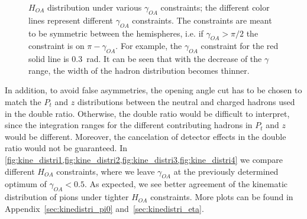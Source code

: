 \begin{figure}[h]
  \centering     %
  \caption[$H_{OA}$ distribution under various $\gamma_{OA}$ constraints]{$H_{OA}$ distribution under various $\gamma_{OA}$ constraints; the different color lines represent different $\gamma_{OA}$ constraints. The constraints are meant to be symmetric between the hemispheres, i.e. if  $\gamma_{OA}> \pi/2$ the constraint is on $\pi-\gamma_{OA} $.  For example, the $\gamma_{OA}$ constraint for the red solid line is 0.3~rad. It can be seen that with the decrease of the $\gamma$ range, the width of the hadron distribution becomes thinner.}
  \label{fig:OAs}
\end{figure}



In addition, to avoid false asymmetries, the opening angle cut has to be chosen to match the $P_t$ and $z$ distributions between the neutral and charged hadrons used in the double ratio. Otherwise, the double ratio would be difficult to interpret, since the integration ranges for the different contributing hadrons in $P_t$ and $z$ would be different. Moreover, the cancelation of detector effects in the double ratio would not be guaranteed.
In \cref{fig:kine_distri1,fig:kine_distri2,fig:kine_distri3,fig:kine_distri4} we compare different $H_{OA}$ constraints, where we leave $\gamma_{OA}$ at the previously determined optimum of $\gamma_{OA}<0.5$.
As expected, we see better agreement of the kinematic distribution of pions under tighter $H_{OA}$ constraints. More plots can be found in Appendix~\ref{sec:kinedistri_pi0} and~\ref{sec:kinedistri_eta}.
 
